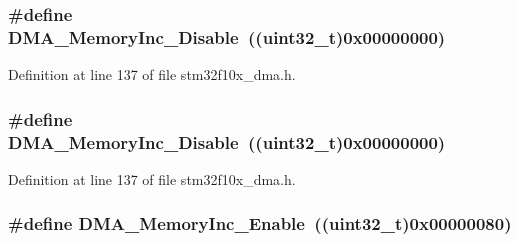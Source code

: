 \subsubsection[{\texorpdfstring{D\+M\+A\+\_\+\+Memory\+Inc\+\_\+\+Disable}{DMA_MemoryInc_Disable}}]{\setlength{\rightskip}{0pt plus 5cm}\#define D\+M\+A\+\_\+\+Memory\+Inc\+\_\+\+Disable~(({\bf uint32\+\_\+t})0x00000000)}\hypertarget{group___d_m_a__memory__incremented__mode_ga795a277c997048783a383b026f19a5ab}{}\label{group___d_m_a__memory__incremented__mode_ga795a277c997048783a383b026f19a5ab}


Definition at line 137 of file stm32f10x\+\_\+dma.\+h.

\subsubsection[{\texorpdfstring{D\+M\+A\+\_\+\+Memory\+Inc\+\_\+\+Disable}{DMA_MemoryInc_Disable}}]{\setlength{\rightskip}{0pt plus 5cm}\#define D\+M\+A\+\_\+\+Memory\+Inc\+\_\+\+Disable~(({\bf uint32\+\_\+t})0x00000000)}\hypertarget{group___d_m_a__memory__incremented__mode_ga795a277c997048783a383b026f19a5ab}{}\label{group___d_m_a__memory__incremented__mode_ga795a277c997048783a383b026f19a5ab}


Definition at line 137 of file stm32f10x\+\_\+dma.\+h.

\subsubsection[{\texorpdfstring{D\+M\+A\+\_\+\+Memory\+Inc\+\_\+\+Enable}{DMA_MemoryInc_Enable}}]{\setlength{\rightskip}{0pt plus 5cm}\#define D\+M\+A\+\_\+\+Memory\+Inc\+\_\+\+Enable~(({\bf uint32\+\_\+t})0x00000080)}\hypertarget{group___d_m_a__memory__incremented__mode_ga4e8cb23d039c74bbbf365d7678835bbb}{}\label{group___d_m_a__memory__incremented__mode_ga4e8cb23d039c74bbbf365d7678835bbb}


